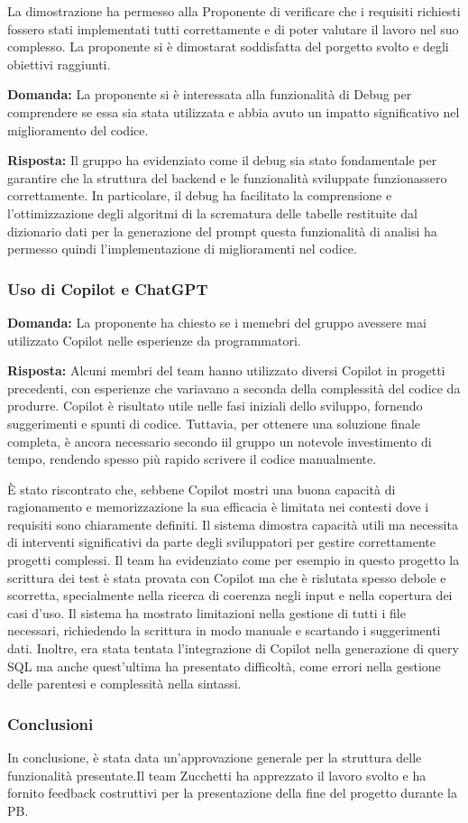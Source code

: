 \par La dimostrazione ha permesso alla Proponente di verificare che i requisiti richiesti fossero stati implementati tutti correttamente e di poter valutare il lavoro nel suo complesso. La proponente si è dimostarat soddisfatta del porgetto svolto e degli obiettivi raggiunti. 
\par \textbf{Domanda:} La proponente si è interessata alla funzionalità di Debug per comprendere se essa sia stata utilizzata e abbia avuto un impatto significativo nel miglioramento del codice.

\par \textbf{Risposta:} Il gruppo ha evidenziato come il debug sia stato fondamentale per garantire che la struttura del backend e le funzionalità sviluppate funzionassero correttamente. In particolare, il debug ha facilitato la comprensione e l'ottimizzazione degli algoritmi di la scrematura delle tabelle restituite dal dizionario dati per la generazione del prompt questa funzionalità di analisi ha permesso quindi l’implementazione di miglioramenti nel codice.

\subsubsection{Uso di Copilot e ChatGPT}

\par \textbf{Domanda:} La proponente ha chiesto se i memebri del gruppo avessere mai utilizzato Copilot nelle esperienze da programmatori.

\par \textbf{Risposta:} Alcuni membri del team hanno utilizzato diversi Copilot in progetti precedenti, con esperienze che variavano a seconda della complessità del codice da produrre. Copilot è risultato utile nelle fasi iniziali dello sviluppo, fornendo suggerimenti e spunti di codice. Tuttavia, per ottenere una soluzione finale completa, è ancora necessario secondo iil gruppo un notevole investimento di tempo, rendendo spesso più rapido scrivere il codice manualmente.

\par È stato riscontrato che, sebbene Copilot mostri una buona capacità di ragionamento e memorizzazione la sua efficacia è limitata nei contesti dove i requisiti sono chiaramente definiti. Il sistema dimostra capacità utili ma necessita di interventi significativi da parte degli sviluppatori per gestire correttamente progetti complessi.
Il team ha evidenziato come per esempio in questo progetto la scrittura dei test è stata provata con Copilot ma che è rislutata spesso debole e scorretta, specialmente nella ricerca di coerenza negli input e nella copertura dei casi d'uso. Il sistema ha mostrato limitazioni nella gestione di tutti i file necessari, richiedendo la scrittura in modo manuale e scartando i suggerimenti dati. Inoltre, era stata tentata l'integrazione di Copilot nella generazione di query SQL ma anche quest'ultima ha presentato difficoltà, come errori nella gestione delle parentesi e complessità nella sintassi.

\subsubsection{Conclusioni}

\par In conclusione, è stata data un'approvazione generale per la struttura delle funzionalità presentate.Il team Zucchetti ha apprezzato il lavoro svolto e ha fornito feedback costruttivi per la presentazione della fine del progetto durante la PB.
